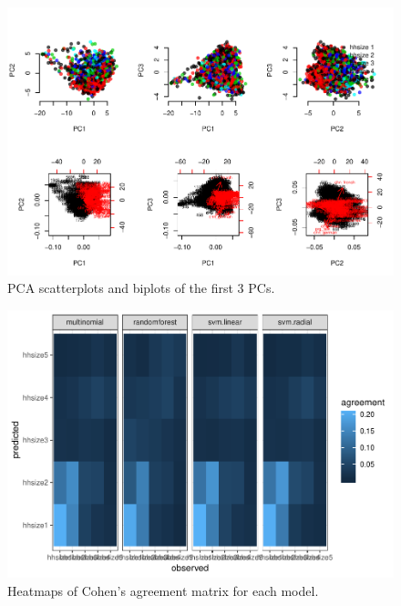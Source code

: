 \documentclass[]{article}
\begin{document}
\pagebreak

\begin{figure}
\centering
\includegraphics{Diploma_files/figure-latex/unnamed-chunk-27-1.pdf}
\caption{\label{fig:fig7} PCA scatterplots and biplots of the first 3
PCs.}
\end{figure}

\pagebreak

\begin{figure}
\centering
\includegraphics{Diploma_files/figure-latex/unnamed-chunk-28-1.pdf}
\caption{\label{fig:fig8} Heatmaps of Cohen's agreement matrix for each
model.}
\end{figure}

\pagebreak
\end{document}
